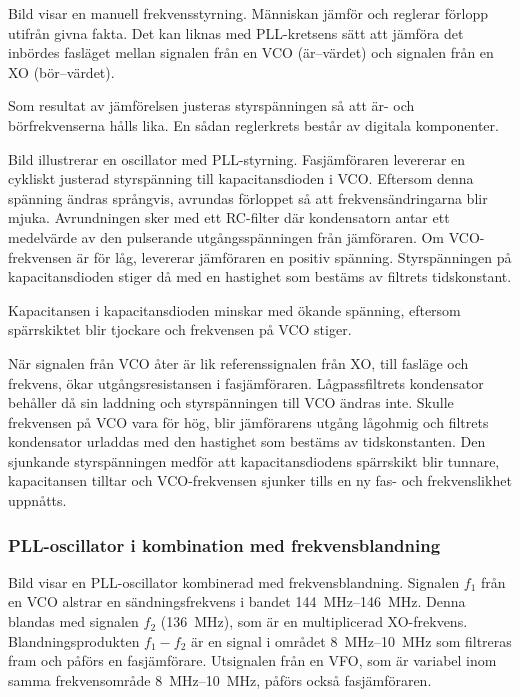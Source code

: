 Bild  visar en manuell frekvensstyrning.
Människan jämför och reglerar förlopp utifrån givna fakta.
Det kan liknas med PLL-kretsens sätt att jämföra det inbördes fasläget mellan
signalen från en VCO (är--värdet) och signalen från en XO (bör--värdet).

Som resultat av jämförelsen justeras styrspänningen så att är- och
börfrekvenserna hålls lika.
En sådan reglerkrets består av digitala komponenter.


Bild  illustrerar en oscillator med PLL-styrning.
Fasjämföraren levererar en cykliskt justerad styrspänning till
kapacitansdioden i VCO.
Eftersom denna spänning ändras språngvis, avrundas förloppet så att
frekvensändringarna blir mjuka.
Avrundningen sker med ett RC-filter där kondensatorn antar ett medelvärde av
den pulserande utgångsspänningen från jämföraren.
Om VCO-frekvensen är för låg, levererar jämföraren en positiv spänning.
Styrspänningen på kapacitansdioden stiger då med en hastighet som bestäms av
filtrets tidskonstant.

Kapacitansen i kapacitansdioden minskar med ökande spänning, eftersom
spärrskiktet blir tjockare och frekvensen på VCO stiger.

När signalen från VCO åter är lik referenssignalen från XO, till
fasläge och frekvens, ökar utgångsresistansen i fasjämföraren.
Lågpassfiltrets kondensator behåller då sin laddning och styrspänningen till
VCO ändras inte.
Skulle frekvensen på VCO vara för hög, blir jämförarens utgång lågohmig och
filtrets kondensator urladdas med den hastighet som bestäms av tidskonstanten.
Den sjunkande styrspänningen medför att kapacitansdiodens spärrskikt blir
tunnare, kapacitansen tilltar och VCO-frekvensen sjunker tills en ny fas- och
frekvenslikhet uppnåtts.

\newpage
\subsubsection{PLL-oscillator i kombination med frekvensblandning}


Bild  visar en PLL-oscillator kombinerad med
frekvensblandning.
Signalen \(f_1\) från en VCO alstrar en sändningsfrekvens i bandet
\SIrange{144}{146}{\mega\hertz}.
Denna blandas med signalen \(f_2\) (\SI{136}{\mega\hertz}), som är en
multiplicerad XO-frekvens.
Blandningsprodukten \(f_1 - f_2\) är en signal i området
\SIrange{8}{10}{\mega\hertz} som filtreras fram och påförs en fasjämförare.
Utsignalen från en VFO, som är variabel inom samma frekvensområde
\SIrange{8}{10}{\mega\hertz}, påförs också fasjämföraren.

